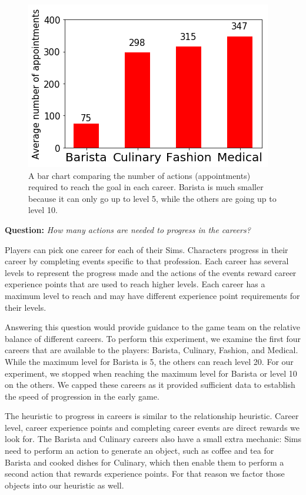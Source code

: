 \documentclass[letterpaper]{article} %
\begin{document}
\begin{figure}[th]
\centering
\includegraphics[width=1.0\linewidth]{images/4_careers.png}
\caption{A bar chart comparing the number of actions (appointments) required to reach the goal in each career. Barista is much smaller because it can only go up to level 5, while the others are going up to level 10.}
\label{Figure:4_career_bar_chart}
\end{figure}

\textbf{Question:} {\em How many actions are needed to progress in the careers?}

Players can pick one career for each of their Sims. Characters progress in their career by completing events specific to that profession. Each career has several levels to represent the progress made and the actions of the events reward career experience points that are used to reach higher levels. Each career has a maximum level to reach and may have different experience point requirements for their levels.

Answering this question would provide guidance to the game team on the relative balance of different careers. To perform this experiment, we examine the first four careers that are available to the players: Barista, Culinary, Fashion, and Medical. While the maximum level for Barista is 5, the others can reach level 20. For our experiment, we stopped when reaching the maximum level for Barista or level 10 on the others. We capped these careers as it provided sufficient data to establish the speed of progression in the early game.

The heuristic to progress in careers is similar to the relationship heuristic. Career level, career experience points and completing career events are direct rewards we look for. The Barista and Culinary careers also have a small extra mechanic: Sims need to perform an action to generate an object, such as coffee and tea for Barista and cooked dishes for Culinary, which then enable them to perform a second action that rewards experience points. For that reason we factor those objects into our heuristic as well.
\end{document}
